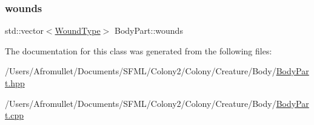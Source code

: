 \subsubsection{\texorpdfstring{wounds}{wounds}}
{\footnotesize\ttfamily std\+::vector$<$\mbox{\hyperlink{_enum_types_8hpp_a585daaeecd1f9f1350c24bf0081a734e}{Wound\+Type}}$>$ Body\+Part\+::wounds\hspace{0.3cm}{\ttfamily [private]}}



The documentation for this class was generated from the following files\+:\begin{DoxyCompactItemize}
\item 
/\+Users/\+Afromullet/\+Documents/\+S\+F\+M\+L/\+Colony2/\+Colony/\+Creature/\+Body/\mbox{\hyperlink{_body_part_8hpp}{Body\+Part.\+hpp}}\item 
/\+Users/\+Afromullet/\+Documents/\+S\+F\+M\+L/\+Colony2/\+Colony/\+Creature/\+Body/\mbox{\hyperlink{_body_part_8cpp}{Body\+Part.\+cpp}}\end{DoxyCompactItemize}
